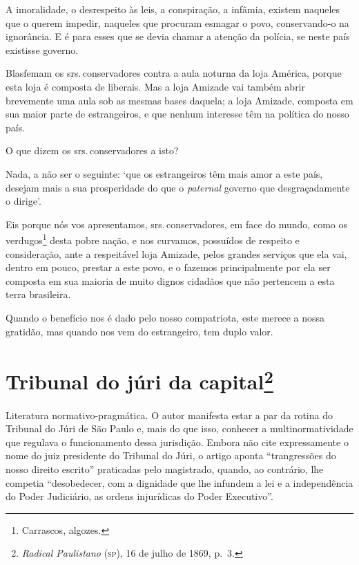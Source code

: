 A imoralidade, o desrespeito às leis, a conspiração, a infâmia, existem
naqueles que o querem impedir, naqueles que procuram esmagar o povo,
conservando-o na ignorância. E é para esses que se devia chamar a
atenção da polícia, se neste país existisse governo.

Blasfemam os srs.\,conservadores contra a aula noturna da loja América,
porque esta loja é composta de liberais. Mas a loja Amizade vai também
abrir brevemente uma aula sob as mesmas bases daquela; a loja Amizade,
composta em sua maior parte de estrangeiros, e que nenhum interesse têm
na política do nosso país.

O que dizem os srs.\,conservadores a isto?

Nada, a não ser o seguinte: `que os estrangeiros têm mais amor a este
país, desejam mais a sua prosperidade do que o \emph{paternal} governo
que desgraçadamente o dirige'.

Eis porque nós vos apresentamos, srs.\,conservadores, em face do mundo,
como os verdugos\footnote{Carrascos, algozes.} desta pobre nação, e
nos curvamos, possuídos de respeito e consideração, ante a respeitável
loja Amizade, pelos grandes serviços que ela vai, dentro em pouco,
prestar a este povo, e o fazemos principalmente por ela ser composta em
sua maioria de muito dignos cidadãos que não pertencem a esta terra
brasileira.

Quando o benefício nos é dado pelo nosso compatriota, este merece a
nossa gratidão, mas quando nos vem do estrangeiro, tem duplo valor.

\chapter{Tribunal do júri da capital\footnote{\emph{Radical Paulistano}
  (\textsc{sp}), 16 de julho de 1869, p.~3.}}

\begin{didascalia}
Literatura normativo-pragmática. O autor manifesta estar a par da rotina
do Tribunal do Júri de São Paulo e, mais do que isso, conhecer a
multinormatividade que regulava o funcionamento dessa jurisdição. Embora
não cite expressamente o nome do juiz presidente do Tribunal do Júri, o
artigo aponta ``trangressões do nosso direito escrito'' praticadas pelo
magistrado, quando, ao contrário, lhe competia ``desobedecer, com a
dignidade que lhe infundem a lei e a independência do Poder Judiciário,
as ordens injurídicas do Poder Executivo''.
\end{didascalia}



